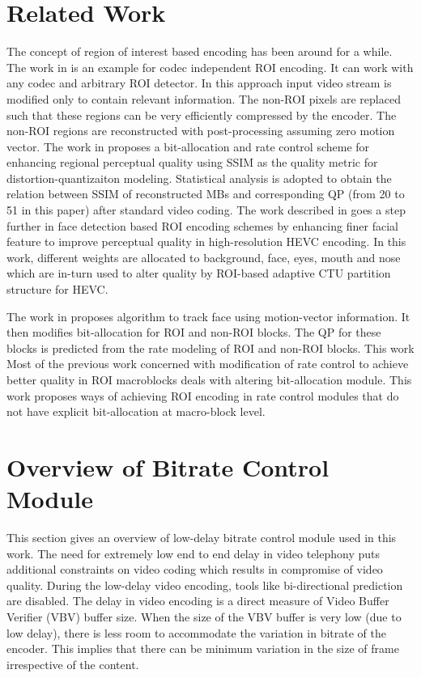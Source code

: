 \documentclass[11pt]{article} %
\begin{document}
\section{Related Work}

The concept of region of interest based encoding has been around for a while.
The work in \cite{pre-postprocessig-ROI-codec-independent} is an example for codec independent ROI encoding. It can work with any codec and arbitrary ROI detector. In this approach input video stream is modified only to contain relevant information. The non-ROI pixels are replaced such that these regions can be very efficiently compressed by the encoder. The non-ROI regions are reconstructed with post-processing assuming zero motion vector. 
The work in \cite{ROI-bit-allocation-h264} proposes a bit-allocation and rate control scheme for enhancing regional perceptual quality using SSIM as the quality metric for distortion-quantizaiton modeling. Statistical analysis is adopted to obtain the relation between SSIM of reconstructed MBs and corresponding QP (from 20 to 51 in this paper) after standard video coding.
The work described in \cite{Perception-model-of-face} goes a step further in face detection based ROI encoding schemes by enhancing finer facial feature to improve perceptual quality in high-resolution HEVC encoding. In this work, different weights are allocated to background, face, eyes, mouth and nose which are in-turn used to alter quality by ROI-based adaptive CTU partition structure for HEVC. 

The work in \cite{ROI-MV-based-face-tracking} proposes algorithm to track face using motion-vector information. It then modifies bit-allocation for ROI and non-ROI blocks. The QP for these blocks is predicted from the rate modeling of ROI and non-ROI blocks. This work 
Most of the previous work concerned with modification of rate control to achieve better quality in ROI macroblocks deals with altering bit-allocation module. This work proposes ways of achieving ROI encoding in rate control modules that do not have explicit bit-allocation at macro-block level.

\section{Overview of Bitrate Control Module}
This section gives an overview of low-delay bitrate control module used in this work. The need for extremely low end to end delay in video telephony puts additional constraints on video coding which results in compromise of video quality. During the low-delay video encoding, tools like bi-directional prediction are disabled. The delay in video encoding is a direct measure of Video Buffer Verifier (VBV) buffer size. When the size of the VBV buffer is very low (due to low delay), there is less room to accommodate the variation in bitrate of the encoder. This implies that there can be minimum variation in the size of frame irrespective of the content.
 
\end{document}
